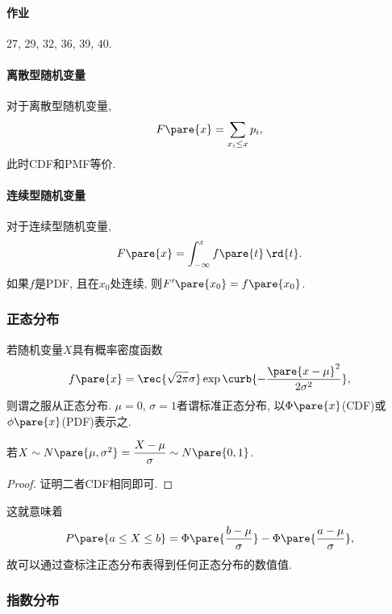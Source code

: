 \documentclass[../Statistics.tex]{subfiles}
\begin{document}
\paragraph{作业} %
\label{par:作业}

27, 29, 32, 36, 39, 40.


\paragraph{离散型随机变量} %
\label{par:离散型随机变量}

对于离散型随机变量,
\[ F\pare{x} = \sum_{x_i \le x} p_i, \]
此时CDF和PMF等价.


\paragraph{连续型随机变量} %
\label{par:连续型随机变量}

对于连续型随机变量,
\[ F\pare{x} = \int_{-\infty}^x f\pare{t}\,\rd{t}. \]
如果$f$是PDF, {\color{red}且在$x_0$处连续}, 则$F'\pare{x_0} = f\pare{x_0}$.


\subsubsection{正态分布} %
\label{ssub:正态分布}

若随机变量$X$具有概率密度函数
\[ f\pare{x} = \rec{\sqrt{2\pi}\sigma} \exp\curb{-\frac{\pare{x-\mu}^2}{2\sigma^2}}, \]
则谓之服从正态分布. $\mu = 0$, $\sigma=1$者谓标准正态分布, 以$\Phi\pare{x}$(CDF)或$\phi\pare{x}$(PDF)表示之.
\begin{lemma}
    若$X\sim N\pare{\mu,\sigma^2} = \displaystyle \frac{X - \mu}{\sigma} \sim N\pare{0,1}$.
\end{lemma}
\begin{proof}
    证明二者CDF相同即可.
\end{proof}
这就意味着
\[ P\pare{a\le X \le b} = \Phi\pare{\frac{b-\mu}{\sigma}} - \Phi\pare{\frac{a-\mu}{\sigma}}, \]
故可以通过查标注正态分布表得到任何正态分布的数值值.


\subsubsection{指数分布} %
\label{ssub:指数分布}
\end{document}

